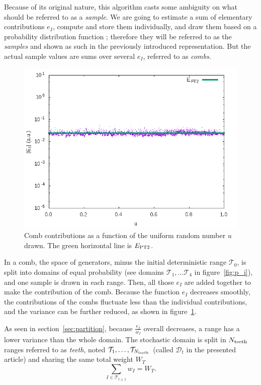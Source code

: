 \documentclass[./thesis.tex]{subfiles}
\begin{document}
Because of its original nature, this algorithm casts some ambiguity on what should be referred to as a \emph{sample}. We are going to estimate a sum of elementary contributions $e_I$, compute and store them individually, and draw them based on a probability distribution function ; therefore they will be referred to as the \emph{samples} and shown as such in the previously introduced representation. But the actual sample values are sums over several $e_I$, referred to as \emph{combs}.

\begin{figure}[h!]
	\begin{center}
		\includegraphics[width=0.7\columnwidth]{figures/pt2/comb_variance}
	\end{center}
		\caption{Comb contributions as a function of the uniform random number $u$ drawn. The green horizontal line is $E_\text{PT2}$.}
		\label{fig:ei_comb}
\end{figure}
In a comb, the space of generators, minus the initial deterministic range $\mathcal{T}_0$, is split into domains of equal probability (see
domains $\mathcal{T}_1, \dots \mathcal{T}_4$ in figure~\ref{fig:p_i}), and
one sample is drawn in each range. Then, all those $e_I$ are added together to make the contribution of the comb. Because the function $e_I$ decreases smoothly, the contributions of the combs fluctuate less than the individual contributions, and the variance can be further reduced, as shown in figure~\ref{fig:ei_comb}.

As seen in section~\ref{sec:partition}, because $\frac{e_I}{w_I}$ overall decreases, a range has a lower variance than the whole domain. The stochastic domain is split in $N_\text{teeth}$ ranges referred to as \emph{teeth}, noted $\mathcal{T}_1,\ldots,\mathcal{T}_{N_\text{teeth}}$ (called $\mathcal{D}_t$ in the presented article) and sharing the same total weight $W_T$
\begin{equation}
\sum_{I \in \mathcal{T}_{t \geq 1}} w_I=W_T.
\end{equation}
\end{document}
